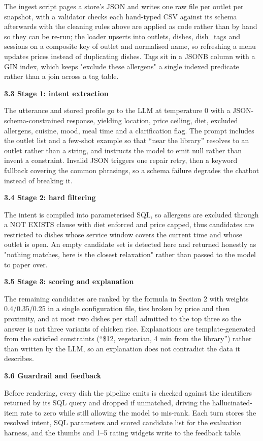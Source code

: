 \documentclass{article}
\begin{document}
 The ingest script pages a store's JSON and writes one raw file per outlet per snapshot, with a validator checks each hand-typed CSV against its schema afterwards with the cleaning rules above are applied as code rather than by hand so they can be re-run; the loader upserts into outlets, dishes, dish\_tags and sessions on a composite key of outlet and normalised name, so refreshing a menu updates prices instead of duplicating dishes. Tags sit in a JSONB column with a GIN index, which keeps "exclude these allergens" a single indexed predicate rather than a join across a tag table.

\textbf{3.3 Stage 1: intent extraction}

 The utterance and stored profile go to the LLM at temperature 0 with a JSON-schema-constrained response, yielding location, price ceiling, diet, excluded allergens, cuisine, mood, meal time and a clarification flag. The prompt includes the outlet list and a few-shot example so that ``near the library'' resolves to an outlet rather than a string, and instructs the model to emit null rather than invent a constraint. Invalid JSON triggers one repair retry, then a keyword fallback covering the common phrasings, so a schema failure degrades the chatbot instead of breaking it.

\textbf{3.4 Stage 2: hard filtering}

 The intent is compiled into parameterised SQL, so allergens are excluded through a NOT EXISTS clause with diet enforced and price capped, thus candidates are restricted to dishes whose service window covers the current time and whose outlet is open. An empty candidate set is detected here and returned honestly as "nothing matches, here is the closest relaxation" rather than passed to the model to paper over.

\textbf{3.5 Stage 3: scoring and explanation}

 The remaining candidates are ranked by the formula in Section 2 with weights 0.4/0.35/0.25 in a single configuration file, ties broken by price and then proximity, and at most two dishes per stall admitted to the top three so the answer is not three variants of chicken rice. Explanations are template-generated from the satisfied constraints (``\$12, vegetarian, 4 min from the library'') rather than written by the LLM, so an explanation does not contradict the data it describes.

\textbf{3.6  Guardrail and feedback}

 Before rendering, every dish the pipeline emits is checked against the identifiers returned by its SQL query and dropped if unmatched, driving the hallucinated-item rate to zero while still allowing the model to mis-rank. Each turn stores the resolved intent, SQL parameters and scored candidate list for the evaluation harness, and the thumbs and 1--5 rating widgets write to the feedback table.
\end{document}
